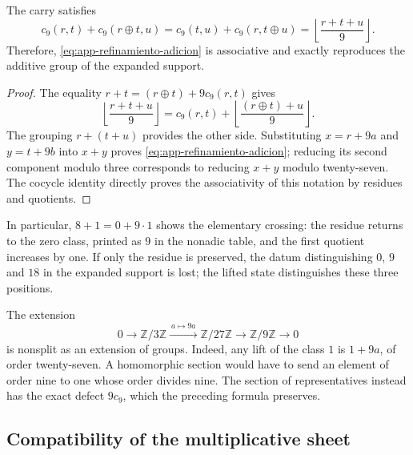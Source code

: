 \begin{proposition}
\label{prop:app-refinamiento-cociclo}
The carry satisfies
\begin{equation}
 c_9(r,t)+c_9(r\oplus t,u)
 =c_9(t,u)+c_9(r,t\oplus u)
 =\left\lfloor\frac{r+t+u}{9}\right\rfloor.
 \label{eq:app-refinamiento-cociclo}
\end{equation}
Therefore, \eqref{eq:app-refinamiento-adicion} is associative and
exactly reproduces the additive group of the expanded support.
\end{proposition}
\begin{proof}
The equality $r+t=(r\oplus t)+9c_9(r,t)$ gives
\[
 \left\lfloor\frac{r+t+u}{9}\right\rfloor
 =c_9(r,t)+\left\lfloor\frac{(r\oplus t)+u}{9}\right\rfloor.
\]
The grouping $r+(t+u)$ provides the other side. Substituting
$x=r+9a$ and $y=t+9b$ into $x+y$ proves
\eqref{eq:app-refinamiento-adicion}; reducing its second
component modulo three corresponds to reducing $x+y$ modulo twenty-seven.
The cocycle identity directly proves the associativity of this
notation by residues and quotients.
\end{proof}

In particular, $8+1=0+9\cdot1$ shows the elementary crossing: the residue
returns to the zero class, printed as $9$ in the nonadic table, and the
first quotient increases by one. If only the residue
is preserved, the datum distinguishing $0$, $9$ and $18$ in the expanded
support is lost; the lifted state distinguishes these three positions.

The extension
\[
 0\longrightarrow\mathbb Z/3\mathbb Z
 \xrightarrow{\ a\mapsto9a\ }
 \mathbb Z/27\mathbb Z
 \longrightarrow\mathbb Z/9\mathbb Z\longrightarrow0
\]
is nonsplit as an extension of groups. Indeed, any
lift of the class $1$ is $1+9a$, of order twenty-seven. A
homomorphic section would have to send an element of order nine to one
whose order divides nine. The section of representatives instead has
the exact defect $9c_9$, which the preceding formula preserves.

\subsection{Compatibility of the multiplicative sheet}

